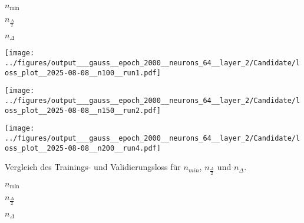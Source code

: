 \begin{otherlanguage}{ngerman}
\begin{samepage}
\begin{minipage}{\textwidth}
\label{fig:matrix_plot_gauss}

\begin{minipage}{0.05\textwidth}\vspace{0.5cm}\end{minipage}%
\begin{minipage}{0.3\textwidth}\centering \textbf{$n_{\mathrm{min}}$}\end{minipage}%
\begin{minipage}{0.3\textwidth}\centering \textbf{$n_{\frac{\Delta}{2}}$}\end{minipage}%
\begin{minipage}{0.3\textwidth}\centering \textbf{$n_{\Delta}$}\end{minipage}

\vspace{0.125cm}

\begin{minipage}{0.05\textwidth}\centering{}\end{minipage}%
\begin{minipage}{0.3\textwidth}
    \centering
    \texttt{[image: ../figures/output\_\_\_gauss\_\_epoch\_2000\_\_neurons\_64\_\_layer\_2/Candidate/loss\_plot\_\_2025-08-08\_\_n100\_\_run1.pdf]}
\end{minipage}%
\begin{minipage}{0.3\textwidth}
    \centering
    \texttt{[image: ../figures/output\_\_\_gauss\_\_epoch\_2000\_\_neurons\_64\_\_layer\_2/Candidate/loss\_plot\_\_2025-08-08\_\_n150\_\_run2.pdf]}
\end{minipage}%
\begin{minipage}{0.3\textwidth}
    \centering
    \texttt{[image: ../figures/output\_\_\_gauss\_\_epoch\_2000\_\_neurons\_64\_\_layer\_2/Candidate/loss\_plot\_\_2025-08-08\_\_n200\_\_run4.pdf]}
\end{minipage}

\caption{Vergleich des Trainings- und Validierungsloss für $n_{min}$, $n_{\frac{\Delta}{2}}$ und $n_{\Delta}$.}
\label{fig:matrix_plot}

\begin{minipage}{0.05\textwidth}\vspace{0.5cm}\end{minipage}%
\begin{minipage}{0.3\textwidth}\centering \textbf{$n_{\mathrm{min}}$}\end{minipage}%
\begin{minipage}{0.3\textwidth}\centering \textbf{$n_{\frac{\Delta}{2}}$}\end{minipage}%
\begin{minipage}{0.3\textwidth}\centering \textbf{$n_{\Delta}$}\end{minipage}


\end{minipage}
\end{samepage}
\end{otherlanguage}
